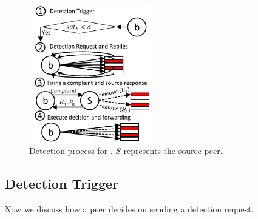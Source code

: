 \begin{figure}
 \centering
 \includegraphics[width=5.5cm,height=6cm]{./Figures/detection.pdf}
  \caption{Detection process for \drop. $S$ represents the source peer.}
\label{detection-blocks} 
\end{figure}

\subsection{Detection Trigger}
\label{Detection-Trigger}
 Now we discuss how a peer decides on sending a detection request.
% 

